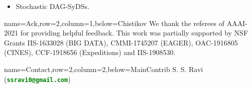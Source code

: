 \documentclass[landscape,a0paper,fontscale=0.285]{baposter} %
\begin{document}
\begin{poster}
{\begin{itemize}[leftmargin=*,noitemsep,topsep=0pt]
\item Stochastic DAG-SyDSs.
\end{itemize}
}


          {name=Ack,row=2,column=1,below=Chistikov}{
{\small 
We thank the referees of AAAI-2021 for providing
helpful feedback. 
This work was partially supported by NSF
Grants IIS-1633028 (BIG DATA), CMMI-1745207 (EAGER), OAC-1916805
(CINES), CCF-1918656 (Expeditions) and IIS-1908530.}
}


          {name=Contact,row=2,column=2,below=MainContrib}{
{S. S. Ravi~ (\textcolor{green}{\textbf{\texttt{ssravi0@gmail.com}}})}
}

\end{poster}
\end{document}
